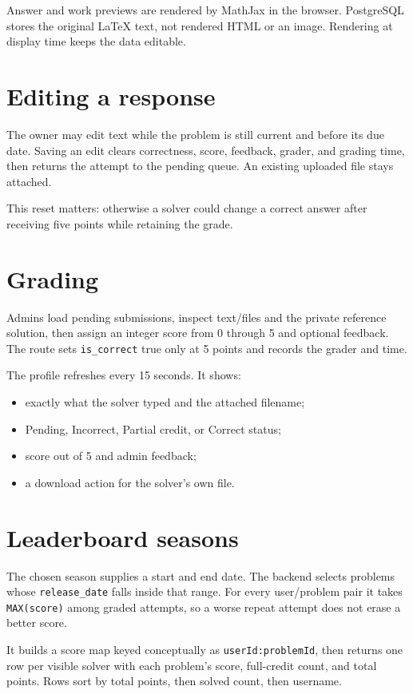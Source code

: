 \documentclass[11pt,oneside]{book}
\newcommand{\code}[1]{\texttt{#1}}
\begin{document}
Answer and work previews are rendered by MathJax in the browser. PostgreSQL stores the original LaTeX text, not rendered HTML or an image. Rendering at display time keeps the data editable.

\section{Editing a response}
The owner may edit text while the problem is still current and before its due date. Saving an edit clears correctness, score, feedback, grader, and grading time, then returns the attempt to the pending queue. An existing uploaded file stays attached.

This reset matters: otherwise a solver could change a correct answer after receiving five points while retaining the grade.

\section{Grading}
Admins load pending submissions, inspect text/files and the private reference solution, then assign an integer score from 0 through 5 and optional feedback. The route sets \code{is\_correct} true only at 5 points and records the grader and time.

The profile refreshes every 15 seconds. It shows:
\begin{itemize}
  \item exactly what the solver typed and the attached filename;
  \item Pending, Incorrect, Partial credit, or Correct status;
  \item score out of 5 and admin feedback;
  \item a download action for the solver's own file.
\end{itemize}

\section{Leaderboard seasons}
The chosen season supplies a start and end date. The backend selects problems whose \code{release\_date} falls inside that range. For every user/problem pair it takes \code{MAX(score)} among graded attempts, so a worse repeat attempt does not erase a better score.

It builds a score map keyed conceptually as \code{userId:problemId}, then returns one row per visible solver with each problem's score, full-credit count, and total points. Rows sort by total points, then solved count, then username.
\end{document}
